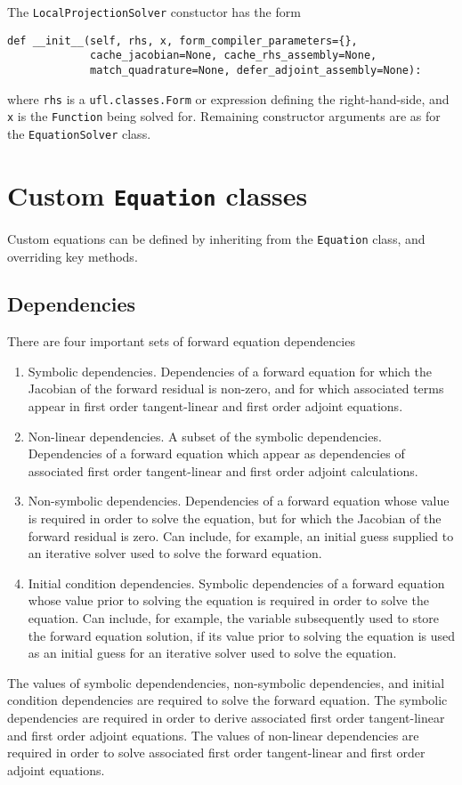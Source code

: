 \documentclass[11pt]{article}
\begin{document}
The \texttt{LocalProjectionSolver} constuctor has the form
\begin{lstlisting}
def __init__(self, rhs, x, form_compiler_parameters={},
             cache_jacobian=None, cache_rhs_assembly=None,
             match_quadrature=None, defer_adjoint_assembly=None):
\end{lstlisting}
where \texttt{rhs} is a \texttt{ufl.classes.Form} or expression defining
the right-hand-side, and \texttt{x} is the \texttt{Function} being solved for.
Remaining constructor arguments are as for the \texttt{EquationSolver} class.

\section{Custom \texttt{Equation} classes}\label{sect:custom}

Custom equations can be defined by inheriting from the \texttt{Equation} class,
and overriding key methods.

\subsection{Dependencies}

There are four important sets of forward equation dependencies
\begin{enumerate}
  \item Symbolic dependencies. Dependencies of a forward equation for which the
    Jacobian of the forward residual is non-zero, and for which associated
    terms appear in first order tangent-linear and first order adjoint
    equations.
  \item Non-linear dependencies. A subset of the symbolic dependencies.
    Dependencies of a forward equation which appear as dependencies of
    associated first order tangent-linear and first order adjoint calculations.
  \item Non-symbolic dependencies. Dependencies of a forward equation whose
    value is required in order to solve the equation, but for which the
    Jacobian of the forward residual is zero. Can include, for example, an
    initial guess supplied to an iterative solver used to solve the forward
    equation.
  \item Initial condition dependencies. Symbolic dependencies of a forward
    equation whose value prior to solving the equation is required in order to
    solve the equation. Can include, for example, the variable subsequently
    used to store the forward equation solution, if its value prior to solving
    the equation is used as an initial guess for an iterative solver used to
    solve the equation.
\end{enumerate}
The values of symbolic dependendencies, non-symbolic dependencies, and initial
condition dependencies are required to solve the forward equation. The symbolic
dependencies are required in order to derive associated first order
tangent-linear and first order adjoint equations. The values of non-linear
dependencies are required in order to solve associated first order
tangent-linear and first order adjoint equations.
\end{document}
